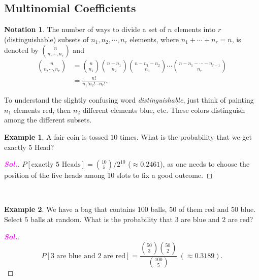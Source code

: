\documentclass[12pt,a4paper]{article}
\theoremstyle{definition}
\newtheorem{example}{Example}[section]
\theoremstyle{definition}
\theoremstyle{definition}
\newtheorem*{notation}{Notation}
\theoremstyle{definition}
\theoremstyle{remark}
\theoremstyle{definition}
\newcommand{\dispsty}{\displaystyle}
\newcommand{\sol}{\textcolor{magenta}{\bf \textit{Sol.}}\quad}
\begin{document}
\subsection{Multinomial Coefficients}
\begin{tcolorbox}[colback=white]
	\begin{notation}
		The number of ways to divide a set of $n$ elements into $r$ (distinguishable) subsets of $n_1,n_2,\cdots,n_r$ elements, where $n_1+\cdots+n_r=n$, is denoted by $\dispsty\binom{n}{n,\cdots, n_r}$ and \begin{align*}
		\binom{n}{n,\cdots, n_r}&=\binom{n}{n_1}\binom{n-n_1}{n_2}\binom{n-n_1-n_2}{n_3}\cdots\binom{n-n_1-\cdots-n_{r-1}}{n_r}\\
		&=\frac{n!}{n_1!n_2!\cdots n_r!}.
		\end{align*}
	\end{notation}
\end{tcolorbox} To understand the slightly confusing word \textit{distinguishable}, just think of painting $n_1$ elements red, then $n_2$ different elements blue, etc. These colors distinguish among the different subsets.
\\
\begin{example}
	A fair coin is tossed $10$ times. What is the probability that we get exactly $5$ Head?\begin{proof}[\sol]
		$P[\text{exactly 5 Heads}]=\binom{10}{5}/2^{10}$ ($\approx0.2461$), as one needs to choose the position of the five heads among 10 slots to fix a good outcome.
	\end{proof}
\end{example}
\
\begin{example}
	We have a bag that contains $100$ balls, $50$ of them red and $50$ blue. Select $5$ balls at random. What is the probability that $3$ are blue and $2$ are red?\begin{proof}[\sol]
		\[
		P[\text{$3$ are blue and $2$ are red}]=\frac{\dispsty\binom{50}{3}\binom{50}{2}}{\dispsty\binom{100}{5}}\ (\approx0.3189).
		\]
	\end{proof}
\end{example}
\
\end{document}
